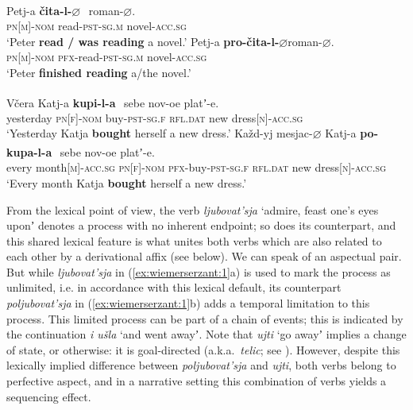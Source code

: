 \documentclass[output=paper]{langsci/langscibook}
\begin{document}
\ea \label{ex:wiemerserzant:2}
\ea 
\gll Petj-a \textbf{čita-l-}\textbf{$\varnothing$}{\textsuperscript{~}\IPFV} roman-$\varnothing$.\\
\textsc{pn[m]-nom}  read-\textsc{pst-sg.m}      novel-\textsc{acc.sg}\\
\glt ‘Peter \textbf{read / was reading} a novel.’
\ex
\gll Petj-a \textbf{pro-čita-l-${\varnothing}$}{\PFV roman}-\textit{${\varnothing}$}.\\
\textsc{pn[m]-nom}  \textsc{pfx}-read-\textsc{pst-sg.m}    novel-\textsc{acc.sg} \\
\glt ‘Peter \textbf{finished reading} a/the novel.’
\z 
\z 


\ea \label{ex:wiemerserzant:3}
\ea 
\gll Včera     Katj-a \textbf{kupi-l-a}{\textsuperscript{~}\PFV}    sebe     nov-oe platʼ-e. \\
yesterday    \textsc{pn[f]-nom}  buy-\textsc{pst-sg.f}  \textsc{rfl.dat}  new dress\textsc{[n]-acc.sg} \\
\glt ‘Yesterday Katja \textbf{bought} herself a new dress.’
\ex 
\gll Každ-yj mesjac-$\varnothing$    Katj-a \textbf{po-kupa-l-a}{\textsuperscript{~}\IPFV}    sebe     nov-oe platʼ-e.\\
every month\textsc{[m]-acc.sg}  \textsc{pn[f]-nom}  \textsc{pfx}-buy\textsc{-pst-sg.f}  \textsc{rfl.dat}  new dress\textsc{[n]-acc.sg} \\
\glt ‘Every month Katja \textbf{bought} herself a new dress.’
\z 
\z 

From the lexical point of view, the  verb \textit{ljubovat’sja} ‘admire, feast one’s eyes uponʼ denotes a process with no inherent endpoint; so does its  counterpart, and this shared lexical feature is what unites both verbs which are also related to each other by a derivational affix (see below). We can speak of an aspectual pair. But while  \textit{ljubovat’sja} in (\ref{ex:wiemerserzant:1}a) is used to mark the process as unlimited, i.e. in accordance with this lexical default, its  counterpart \textit{poljubovat’sja} in (\ref{ex:wiemerserzant:1}b) adds a temporal limitation to this process. This limited process can be part of a chain of events; this is indicated by the continuation \textit{i ušla} ‘and went awayʼ. Note that \textit{ujti} ‘go awayʼ implies a change of state, or otherwise: it is goal-directed (a.k.a.\ \textit{telic}; see ). However, despite this lexically implied difference between \textit{poljubovat’sja} and \textit{ujti}, both verbs belong to perfective aspect, and in a narrative setting this combination of  verbs yields a sequencing effect.
\end{document}
